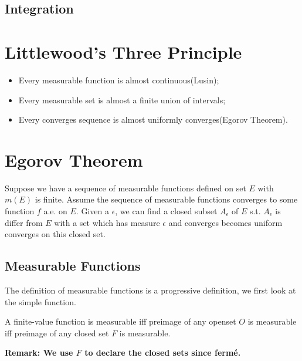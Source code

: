 \documentclass[11pt]{article}
\begin{document}
\subsection{Integration}
\label{sec:org385b031}
\section{Littlewood's Three Principle}
\label{sec:org31385d4}
\begin{theorem}
\leavevmode
\begin{itemize}
\item Every measurable function is almost continuous(Lusin);
\item Every measurable set is almost a finite union of intervals;
\item Every converges sequence is almost uniformly converges(Egorov Theorem).
\end{itemize}
\end{theorem}
\section{Egorov Theorem}
\label{sec:org47ffd19}
\begin{definition}
Suppose we have a sequence of measurable functions defined on set \(E\) with \(m(E)\) is finite. Assume the sequence of measurable functions converges to some function \(f\) a.e. on \(E\). Given a \(\epsilon\), we can find a closed subset \(A_{\epsilon}\) of \(E\) s.t. \(A_{\epsilon}\) is differ from \(E\) with a set which has measure \(\epsilon\) and converges becomes uniform converges on this closed set.
\end{definition}
\subsection{Measurable Functions}
\label{sec:org69f2e12}
The definition of measurable functions is a progressive definition, we first look at the simple function.

\begin{definition}
A finite-value function is measurable iff preimage of any openset \(O\) is measurable iff preimage of any closed set \(F\) is measurable.
\end{definition}
\textbf{Remark: We use \(F\) to declare the closed sets since fermé.}
\end{document}
